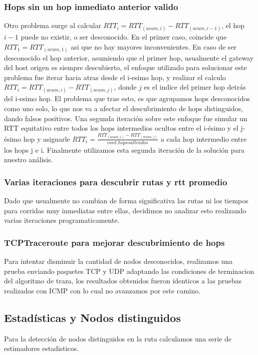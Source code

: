 \subsubsection{Hops sin un hop inmediato anterior valido}
Otro problema surge al calcular $RTT_i = RTT_{(acum, i)} - RTT_{(acum, i-1)}$, 
el hop $i-1$ puede no existir, o ser desconocido. En el primer caso, coincide que $RTT_1 = RTT_{(acum, 1)}$ asi que no hay mayores inconvenientes. En caso de ser desconocido el hop anterior, asumiendo que el primer hop, usualmente el gateway del host origen es siempre descubierto, el enfoque utilizado para solucionar este problema fue iterar hacia atras desde el i-esimo hop, y realizar el calculo $RTT_i = RTT_{(acum, i)} - RTT_{(acum, j)}$, donde $j$ es el indice del primer hop detr\'as del i-esimo hop. El problema que trae esto, es que agrupamos hops desconocidos como uno solo, lo que nos va a afectar el descubrimiento de hops distinguidos, dando falsos positivos. Una segunda iteración sobre este enfoque fue simular un RTT equitativo entre todos los hops intermedios ocultos entre el i-ésimo y el j-ésimo hop y asignarle $RTT_i = \frac{RTT_{(acum, i)} - RTT_{(acum, j)}}{cant. hops salteados}$ a cada hop intermedio entre los hops j e i. Finalmente utilizamos esta segunda iteración de la solución para nuestro análisis.

\subsubsection{Varias iteraciones para descubrir rutas y rtt promedio}
Dado que usualmente no cambian de forma significativa las rutas ni los tiempos para corridas muy inmediatas entre ellas, decidimos no analizar esto realizando varias iteraciones programaticamente.

\subsubsection{TCPTraceroute para mejorar descubrimiento de hops}
Para intentar disminuir la cantidad de nodos desconocidos, realizamos una prueba enviando paquetes TCP y UDP adaptando las condiciones de terminacion del algoritmo de traza, los resultados obtenidos fueron identicos a las pruebas realizadas con ICMP con lo cual no avanzamos por este camino.

\subsection{Estadísticas y Nodos distinguidos}
Para la detección de nodos distinguidos en la ruta calculamos una serie de estimadores estadisticos.
